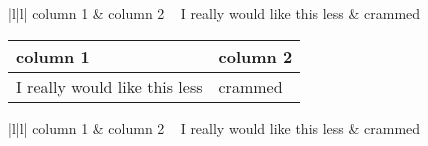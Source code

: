 \documentclass{article}
\begin{document}
{\renewcommand{\arraystretch}{2}%
\begin{tabular}{|l|l|}
  \hline
  column 1 & column 2 \      \hline
  I really would like this less & crammed \      \hline
\end{tabular}} \quad
\begin{tabular}{|l|l|}
  \hline
  column 1 & column 2 \\[4ex]
  \hline
  I really would like this less & crammed \\[5pt]
  \hline
\end{tabular} \quad
{\setlength{\extrarowheight}{20pt}%
\begin{tabular}{|l|l|}
  \hline
  column 1 & column 2 \      \hline
  I really would like this less & crammed \      \hline
\end{tabular}}
\end{document}
